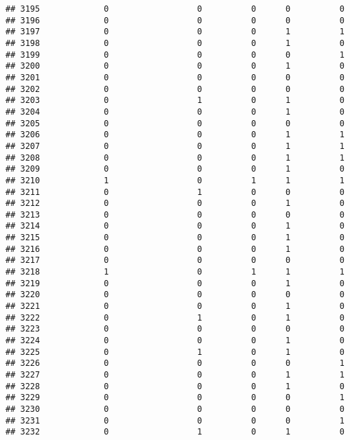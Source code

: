 \documentclass[
]{article}
\begin{document}
\begin{verbatim}
## 3195             0                  0          0      0          0
## 3196             0                  0          0      0          0
## 3197             0                  0          0      1          1
## 3198             0                  0          0      1          0
## 3199             0                  0          0      0          1
## 3200             0                  0          0      1          0
## 3201             0                  0          0      0          0
## 3202             0                  0          0      0          0
## 3203             0                  1          0      1          0
## 3204             0                  0          0      1          0
## 3205             0                  0          0      0          0
## 3206             0                  0          0      1          1
## 3207             0                  0          0      1          1
## 3208             0                  0          0      1          1
## 3209             0                  0          0      1          0
## 3210             1                  0          1      1          1
## 3211             0                  1          0      0          0
## 3212             0                  0          0      1          0
## 3213             0                  0          0      0          0
## 3214             0                  0          0      1          0
## 3215             0                  0          0      1          0
## 3216             0                  0          0      1          0
## 3217             0                  0          0      0          0
## 3218             1                  0          1      1          1
## 3219             0                  0          0      1          0
## 3220             0                  0          0      0          0
## 3221             0                  0          0      1          0
## 3222             0                  1          0      1          0
## 3223             0                  0          0      0          0
## 3224             0                  0          0      1          0
## 3225             0                  1          0      1          0
## 3226             0                  0          0      0          1
## 3227             0                  0          0      1          1
## 3228             0                  0          0      1          0
## 3229             0                  0          0      0          1
## 3230             0                  0          0      0          0
## 3231             0                  0          0      0          1
## 3232             0                  1          0      1          0

\end{verbatim}
\end{document}

